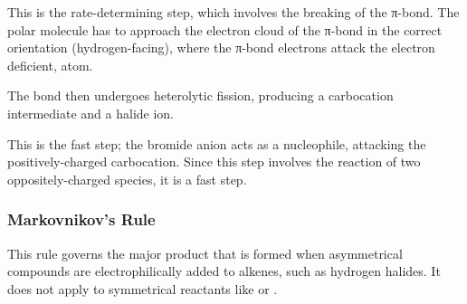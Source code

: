 		This is the rate-determining step, which involves the breaking of the π-bond. The polar  molecule has to
		approach the electron cloud of the π-bond in the correct orientation (hydrogen-facing), where the π-bond electrons
		attack the electron deficient,  atom.

		The  bond then undergoes heterolytic fission, producing a carbocation intermediate and a halide ion.


		\pagebreak


		This is the fast step; the bromide anion acts as a nucleophile, attacking the positively-charged carbocation.
		Since this step involves the reaction of two oppositely-charged species, it is a fast step.


		\vspace{1.0em}




	\subsubsection{Markovnikov's Rule}

		This rule governs the major product that is formed when asymmetrical compounds are electrophilically added to alkenes,
		such as hydrogen halides. It does not apply to symmetrical reactants like  or .

